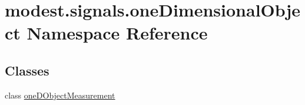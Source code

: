 \hypertarget{namespacemodest_1_1signals_1_1oneDimensionalObject}{}\section{modest.\+signals.\+one\+Dimensional\+Object Namespace Reference}
\label{namespacemodest_1_1signals_1_1oneDimensionalObject}
\subsection*{Classes}
\begin{DoxyCompactItemize}
\item 
class \hyperlink{classmodest_1_1signals_1_1oneDimensionalObject_1_1oneDObjectMeasurement}{one\+D\+Object\+Measurement}
\end{DoxyCompactItemize}
